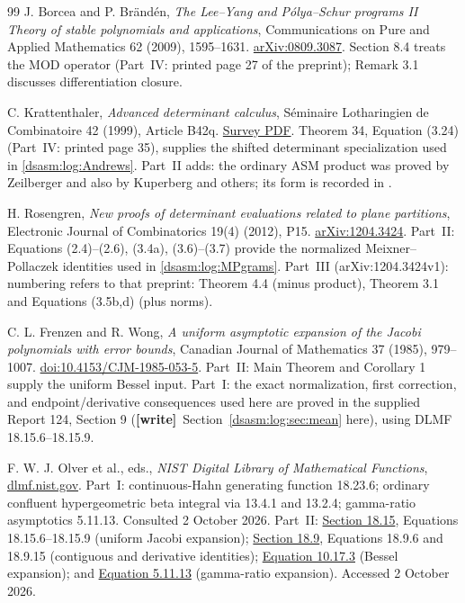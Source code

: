 \documentclass[11pt,letterpaper]{article}
\theoremstyle{remark}\newtheorem{remark}[theorem]{Remark}
\newcommand{\wtag}{\textup{\textbf{[write]}}}
\begin{document}
\begin{thebibliography}{99}
J. Borcea and P. Br\"and\'en,
\emph{The Lee--Yang and P\'olya--Schur programs II
Theory of stable polynomials and applications},
Communications on Pure and Applied Mathematics 62 (2009), 1595--1631.
\href{https://arxiv.org/abs/0809.3087}{arXiv:0809.3087}.
Section 8.4 treats the MOD operator (Part~IV: printed page 27 of the preprint); Remark 3.1 discusses
differentiation closure.

C. Krattenthaler, \emph{Advanced determinant calculus},
S\'eminaire Lotharingien de Combinatoire 42 (1999), Article B42q.
\href{https://www.mat.univie.ac.at/~kratt/akkomb/detsurv.pdf}{Survey PDF}.
Theorem 34, Equation (3.24) (Part~IV: printed page 35), supplies the shifted determinant
specialization used in \eqref{dsasm:log:Andrews}. Part~II adds: the ordinary ASM product was proved by Zeilberger
and also by Kuperberg and others; its form is recorded in
\cite[Equation (1.1)]{bfk}.

H. Rosengren, \emph{New proofs of determinant evaluations related to
plane partitions}, Electronic Journal of Combinatorics 19(4) (2012), P15.
\href{https://arxiv.org/pdf/1204.3424}{arXiv:1204.3424}.
Part~II: Equations (2.4)--(2.6), (3.4a), (3.6)--(3.7) provide the normalized
Meixner--Pollaczek identities used in \eqref{dsasm:log:MPgrams}.
Part~III (arXiv:1204.3424v1): numbering refers to that preprint: Theorem 4.4 (minus product),
Theorem 3.1 and Equations (3.5b,d) (plus norms).

C. L. Frenzen and R. Wong,
\emph{A uniform asymptotic expansion of the Jacobi polynomials
with error bounds}, Canadian Journal of Mathematics 37 (1985),
979--1007.
\href{https://doi.org/10.4153/CJM-1985-053-5}{doi:10.4153/CJM-1985-053-5}.
Part~II: Main Theorem and Corollary 1 supply the uniform Bessel input.
Part~I: the exact normalization, first correction, and endpoint/derivative
consequences used here are proved in the supplied Report 124,
Section 9 (\wtag\ Section~\ref{dsasm:log:sec:mean} here), using DLMF 18.15.6--18.15.9.

F. W. J. Olver et al., eds., \emph{NIST Digital Library of Mathematical
Functions}, \href{https://dlmf.nist.gov/}{dlmf.nist.gov}.
Part~I: continuous-Hahn generating function 18.23.6; ordinary confluent
hypergeometric beta integral via 13.4.1 and 13.2.4; gamma-ratio
asymptotics 5.11.13. Consulted 2 October 2026.
Part~II: \href{https://dlmf.nist.gov/18.15}{Section 18.15},
Equations 18.15.6--18.15.9 (uniform Jacobi expansion);
\href{https://dlmf.nist.gov/18.9}{Section 18.9},
Equations 18.9.6 and 18.9.15 (contiguous and derivative identities);
\href{https://dlmf.nist.gov/10.17#E3}{Equation 10.17.3}
(Bessel expansion); and
\href{https://dlmf.nist.gov/5.11#E13}{Equation 5.11.13}
(gamma-ratio expansion). Accessed 2 October 2026.


\end{thebibliography}
\end{document}

